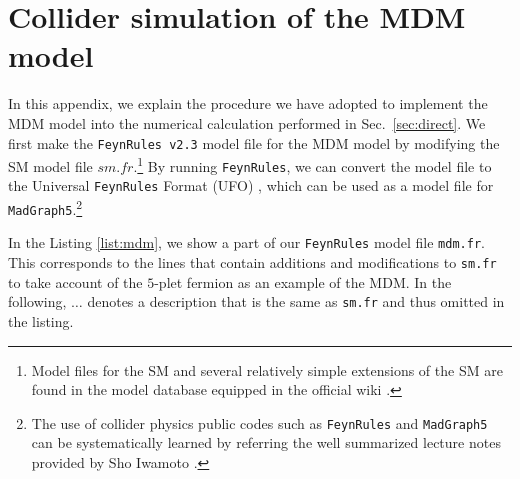\documentclass[12pt,twoside,book]{article}
\begin{document}
\section{Collider simulation of the MDM model}
\label{sec:feynrules}

\vskip 0.1in

In this appendix, we explain the procedure we have adopted to implement the MDM model into the numerical calculation performed in Sec.~\ref{sec:direct}.
We first make the \texttt{FeynRules v2.3} \cite{Alloul:2013bka} model file for the MDM model by modifying the SM model file $sm.fr$.\footnote{
  Model files for the SM and several relatively simple extensions of the SM are found in the model database equipped in the official wiki \cite{Alloul:wiki}.
}
By running \texttt{FeynRules}, we can convert the model file to the Universal \texttt{FeynRules} Format (UFO) \cite{Degrande:2011ua}, which can be used as a model file for \texttt{MadGraph5}.\footnote{
  The use of collider physics public codes such as \texttt{FeynRules} and \texttt{MadGraph5} can be systematically learned by referring the well summarized lecture notes provided by Sho Iwamoto \cite{Iwamoto:FeynLecture}.
}

In the Listing \ref{list:mdm}, we show a part of our \texttt{FeynRules} model file \texttt{mdm.fr}.
This corresponds to the lines that contain additions and modifications to \texttt{sm.fr} to take account of the $5$-plet fermion as an example of the MDM.
In the following, $\dots$ denotes a description that is the same as \texttt{sm.fr} and thus omitted in the listing.
\end{document}
